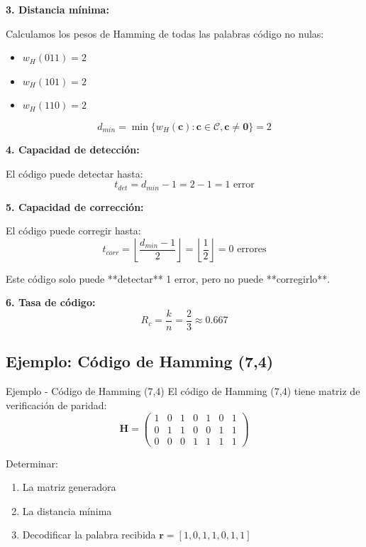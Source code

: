 \documentclass[10pt,a4paper]{article}
\begin{document}
\begin{solucion}
\textbf{3. Distancia mínima:}

Calculamos los pesos de Hamming de todas las palabras código no nulas:
\begin{itemize}
\item $w_H(011) = 2$
\item $w_H(101) = 2$
\item $w_H(110) = 2$
\end{itemize}

\[
\boxed{d_{min} = \min\{w_H(\mathbf{c}) : \mathbf{c} \in \mathcal{C}, \mathbf{c} \neq \mathbf{0}\} = 2}
\]

\textbf{4. Capacidad de detección:}

El código puede detectar hasta:
\[
\boxed{t_{det} = d_{min} - 1 = 2 - 1 = 1 \text{ error}}
\]

\textbf{5. Capacidad de corrección:}

El código puede corregir hasta:
\[
\boxed{t_{corr} = \left\lfloor \frac{d_{min} - 1}{2} \right\rfloor = \left\lfloor \frac{1}{2} \right\rfloor = 0 \text{ errores}}
\]

Este código solo puede **detectar** 1 error, pero no puede **corregirlo**.

\textbf{6. Tasa de código:}
\[
\boxed{R_c = \frac{k}{n} = \frac{2}{3} \approx 0.667}
\]
\end{solucion}

\newpage
\subsection{Ejemplo: Código de Hamming (7,4)}

\begin{ejemplo}{Ejemplo - Código de Hamming (7,4)}
El código de Hamming (7,4) tiene matriz de verificación de paridad:
\[
\mathbf{H} = \begin{pmatrix}
1 & 0 & 1 & 0 & 1 & 0 & 1\\
0 & 1 & 1 & 0 & 0 & 1 & 1\\
0 & 0 & 0 & 1 & 1 & 1 & 1
\end{pmatrix}
\]

Determinar:
\begin{enumerate}
\item La matriz generadora
\item La distancia mínima
\item Decodificar la palabra recibida $\mathbf{r} = [1, 0, 1, 1, 0, 1, 1]$
\end{enumerate}
\end{ejemplo}
\end{document}
